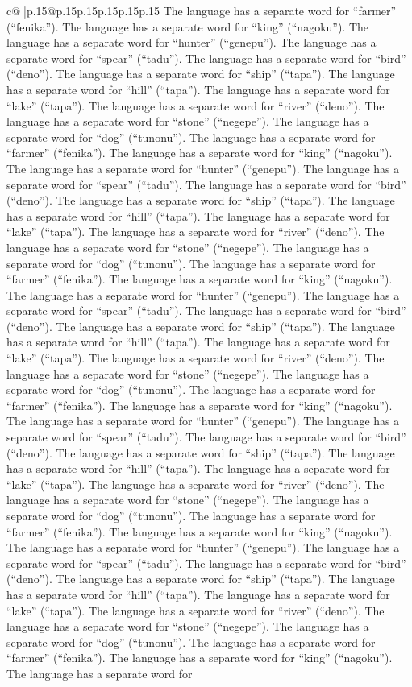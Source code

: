 \documentclass{article}
\begin{document}
{\begin{supertabular}{c@{$\;$}|p{.15\linewidth}@{}p{.15\linewidth}p{.15\linewidth}p{.15\linewidth}p{.15\linewidth}p{.15\linewidth}}
{{{The language has a separate word for “farmer” (“fenika”). The language has a separate word for “king” (“nagoku”). The language has a separate word for “hunter” (“genepu”). The language has a separate word for “spear” (“tadu”). The language has a separate word for “bird” (“deno”). The language has a separate word for “ship” (“tapa”). The language has a separate word for “hill” (“tapa”). The language has a separate word for “lake” (“tapa”). The language has a separate word for “river” (“deno”). The language has a separate word for “stone” (“negepe”). The language has a separate word for “dog” (“tunonu”). The language has a separate word for “farmer” (“fenika”). The language has a separate word for “king” (“nagoku”). The language has a separate word for “hunter” (“genepu”). The language has a separate word for “spear” (“tadu”). The language has a separate word for “bird” (“deno”). The language has a separate word for “ship” (“tapa”). The language has a separate word for “hill” (“tapa”). The language has a separate word for “lake” (“tapa”). The language has a separate word for “river” (“deno”). The language has a separate word for “stone” (“negepe”). The language has a separate word for “dog” (“tunonu”). The language has a separate word for “farmer” (“fenika”). The language has a separate word for “king” (“nagoku”). The language has a separate word for “hunter” (“genepu”). The language has a separate word for “spear” (“tadu”). The language has a separate word for “bird” (“deno”). The language has a separate word for “ship” (“tapa”). The language has a separate word for “hill” (“tapa”). The language has a separate word for “lake” (“tapa”). The language has a separate word for “river” (“deno”). The language has a separate word for “stone” (“negepe”). The language has a separate word for “dog” (“tunonu”). The language has a separate word for “farmer” (“fenika”). The language has a separate word for “king” (“nagoku”). The language has a separate word for “hunter” (“genepu”). The language has a separate word for “spear” (“tadu”). The language has a separate word for “bird” (“deno”). The language has a separate word for “ship” (“tapa”). The language has a separate word for “hill” (“tapa”). The language has a separate word for “lake” (“tapa”). The language has a separate word for “river” (“deno”). The language has a separate word for “stone” (“negepe”). The language has a separate word for “dog” (“tunonu”). The language has a separate word for “farmer” (“fenika”). The language has a separate word for “king” (“nagoku”). The language has a separate word for “hunter” (“genepu”). The language has a separate word for “spear” (“tadu”). The language has a separate word for “bird” (“deno”). The language has a separate word for “ship” (“tapa”). The language has a separate word for “hill” (“tapa”). The language has a separate word for “lake” (“tapa”). The language has a separate word for “river” (“deno”). The language has a separate word for “stone” (“negepe”). The language has a separate word for “dog” (“tunonu”). The language has a separate word for “farmer” (“fenika”). The language has a separate word for “king” (“nagoku”). The language has a separate word for }}}
\end{supertabular}}
\end{document}
